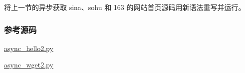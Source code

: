将上一节的异步获取 sina、sohu 和 163 的网站首页源码用新语法重写并运行。

\hypertarget{ux53c2ux8003ux6e90ux7801}{%
\subsubsection{参考源码}\label{ux53c2ux8003ux6e90ux7801}}

\href{https://github.com/michaelliao/learn-python3/blob/master/samples/async/async_hello2.py}{async\_hello2.py}

\href{https://github.com/michaelliao/learn-python3/blob/master/samples/async/async_wget2.py}{async\_wget2.py}

